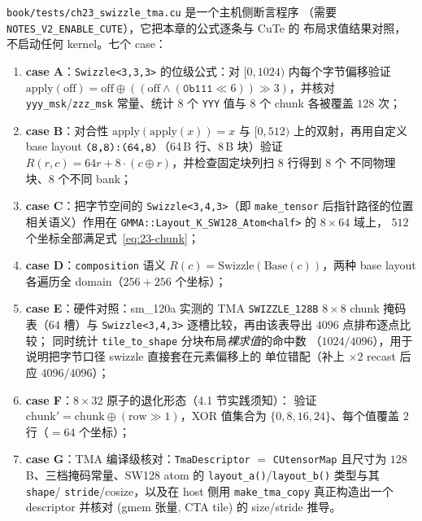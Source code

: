 \texttt{book/\allowbreak{}tests/\allowbreak{}ch23\_\allowbreak{}swizzle\_\allowbreak{}tma.cu} 是一个主机侧断言程序
（需要 \texttt{NOTES\_\allowbreak{}V2\_\allowbreak{}ENABLE\_\allowbreak{}CUTE}），它把本章的公式逐条与 CuTe 的
布局求值结果对照，不启动任何 kernel。七个 case：

\begin{enumerate}[leftmargin=2.2em]
\item \textbf{case A}：\texttt{Swizzle\allowbreak{}<3,\allowbreak{}3,\allowbreak{}3>} 的位级公式：对
$[0,1024)$ 内每个字节偏移验证 $\text{apply}(\text{off})=\text{off}\oplus
((\text{off}\wedge(\texttt{0b111}\ll6))\gg3)$，并核对
\texttt{yyy\_msk}/\texttt{zzz\_msk} 常量、统计 $8$ 个 \texttt{YYY} 值与
$8$ 个 chunk 各被覆盖 $128$ 次；
\item \textbf{case B}：对合性 $\text{apply}(\text{apply}(x))=x$ 与
$[0,512)$ 上的双射，再用自定义 base layout
$\texttt{\allowbreak{}(8,\allowbreak{}8):\allowbreak{}(64,\allowbreak{}8)}$（64\,B 行、8\,B 块）验证
$R(r,c)=64r+8\cdot(c\oplus r)$，并检查固定块列扫 $8$ 行得到 $8$ 个
不同物理块、$8$ 个不同 bank；
\item \textbf{case C}：把字节空间的 \texttt{Swizzle\allowbreak{}<3,\allowbreak{}4,\allowbreak{}3>}（即
\texttt{make\_tensor} 后指针路径的位置相关语义）作用在
\texttt{GMMA::\allowbreak{}Layout\_\allowbreak{}K\_\allowbreak{}SW128\_\allowbreak{}Atom\allowbreak{}<half>} 的 $8\times64$ 域上，
$512$ 个坐标全部满足式~\eqref{eq:23-chunk}；
\item \textbf{case D}：\texttt{composition} 语义
$R(c)=\text{Swizzle}(\text{Base}(c))$，两种 base layout 各遍历全
domain（$256+256$ 个坐标）；
\item \textbf{case E}：硬件对照：sm\_120a 实测的 TMA
\texttt{SWIZZLE\_\allowbreak{}128\allowbreak{}B} $8\times8$ chunk 掩码表（$64$ 槽）与
\texttt{Swizzle\allowbreak{}<3,\allowbreak{}4,\allowbreak{}3>} 逐槽比较，再由该表导出 $4096$ 点排布逐点比较；
同时统计 \texttt{tile\_\allowbreak{}to\_\allowbreak{}shape} 分块布局\emph{裸求值}的命中数
（$1024/4096$），用于说明把字节口径 swizzle 直接套在元素偏移上的
单位错配（补上 $\times2$ recast 后应 $4096/4096$）；
\item \textbf{case F}：$8\times32$ 原子的退化形态（4.1 节实践须知）：
验证 $\text{chunk}'=\text{chunk}\oplus(\text{row}\gg1)$，XOR 值集合为
$\{0,8,16,24\}$、每个值覆盖 $2$ 行（$=64$ 个坐标）；
\item \textbf{case G}：TMA 编译级核对：\texttt{Tma\allowbreak{}Descriptor}
$=$ \texttt{CUtensorMap} 且尺寸为 $128$\,B、三档掩码常量、SW128 atom 的
\texttt{layout\_a()}/\texttt{layout\_b()} 类型与其 \texttt{shape}/
\texttt{stride}/cosize，以及在 host 侧用 \texttt{make\_\allowbreak{}tma\_\allowbreak{}copy}
真正构造出一个 descriptor 并核对 (gmem 张量, CTA tile) 的
size/stride 推导。
\end{enumerate}

